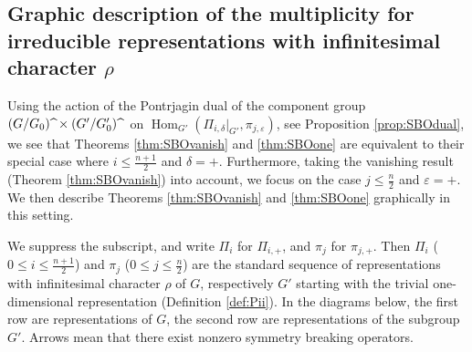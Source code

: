 \subsection{Graphic description of the multiplicity
 for irreducible representations
 with infinitesimal character $\rho$}

Using the action of the Pontrjagin dual 
 of the component group 
 $(G/G_0)\hspace{1mm}{\widehat{}}\, \times (G'/G_0')\hspace{1MM}{\widehat{}}\,\,$
 on ${\operatorname{Hom}}_{G'}(\Pi_{i,\delta}|_{G'}, \pi_{j,\varepsilon})$,
 see Proposition \ref{prop:SBOdual}, 
 we see that Theorems \ref{thm:SBOvanish} and \ref{thm:SBOone}
 are equivalent to their special case
 where $i \le \frac{n+1}{2}$ and $\delta=+$.  
Furthermore, 
 taking the vanishing result (Theorem \ref{thm:SBOvanish}) into account, 
 we focus on the case $j \le \frac n 2$ and $\varepsilon=+$.  
We then describe Theorems \ref{thm:SBOvanish} and \ref{thm:SBOone}
 graphically in this setting.  

We suppress the subscript, 
 and write $\Pi_i$ for $\Pi_{i,+}$, 
 and $\pi_j$ for $\pi_{j,+}$.  
Then $\Pi_i$ ($0 \le i \le \frac{n+1}{2}$)
 and $\pi_j$ ($0 \le j \le \frac{n}{2}$) are the standard sequence of representations with infinitesimal character $\rho$ of $G$,
 respectively $G'$ starting with the trivial one-dimensional representation
(Definition \ref{def:Pii}). 
In the diagrams below, 
 the first row are representations of $G$,
 the second row are representations of the subgroup $G'$. 
Arrows mean
 that there exist nonzero symmetry breaking operators.  



